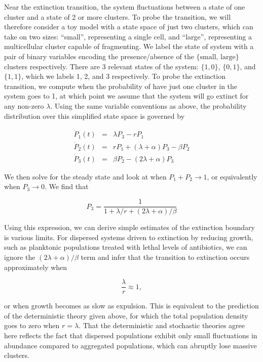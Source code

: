 \documentclass[12pt]{article}
\def\be{\begin{equation}}
\def\ee{\end{equation}}
\def\bea{\begin{eqnarray}}
\def\eea{\end{eqnarray}}
\begin{document}
Near the extinction transition, the system fluctuations between a state of one cluster and a state of 2 or more clusters. To probe the transition, we will therefore consider a toy model with a state space of just two clusters, which can take on two sizes: ``small'', representing a single cell, and ``large'', representing a multicellular cluster capable of fragmenting. We label the state of system with a pair of binary variables encoding the presence/absence of the $\{\text{small, }\text{large}\}$ clusters respectively. There are 3 relevant states of the system: $\{1,0\}$, $\{0,1\}$, and $\{1,1\}$, which we labels 1, 2, and 3 respectively. To probe the extinction transition, we compute when the probability of have just one cluster in the system goes to 1, at which point we assume that the system will go extinct for any non-zero $\lambda$. Using the same variable conventions as above, the probability distribution over this simplified state space is governed by

\bea
	\dot{P}_1(t) &=& \lambda P_3 - rP_1\\
	\dot{P}_2(t) &=& rP_1 + (\lambda + \alpha)P_3 - \beta P_2\\
	\dot{P}_3(t) &=& \beta P_2 - (2\lambda + \alpha) P_3
\eea

\noindent We then solve for the steady state and look at when $P_1 + P_2 \to 1$, or equivalently when $P_3 \to 0$. We find that

\be
	P_3 = \frac{1}{1+\lambda/r + (2\lambda+\alpha)/\beta} 
\ee

\noindent Using this expression, we can derive simple estimates of the extinction boundary is various limits. For dispersed systems driven to extinction by reducing growth, such as planktonic populations treated with lethal levels of antibiotics, we can ignore the $(2\lambda + \alpha)/\beta$ term and infer that the transition to extinction occurs approximately when

\be
\frac{\lambda}{r} \approx 1,
\ee

\noindent or when growth becomes as slow as expulsion. This is equivalent to the prediction of the deterministic theory given above, for which the total population density goes to zero when $r = \lambda$.  That the deterministic and stochastic theories agree here reflects the fact that dispersed populations exhibit only small fluctuations in abundance compared to aggregated populations, which can abruptly lose massive clusters.
\end{document}
